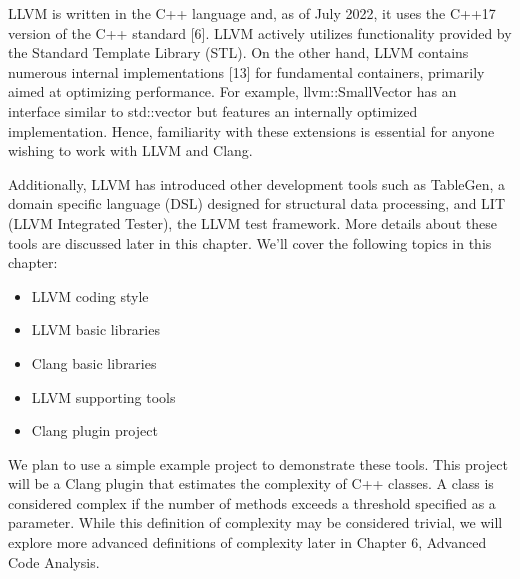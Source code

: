 LLVM is written in the C++ language and, as of July 2022, it uses the C++17 version of the C++ standard [6]. LLVM actively utilizes functionality provided by the Standard Template Library (STL). On the other hand, LLVM contains numerous internal implementations [13] for fundamental containers, primarily aimed at optimizing performance. For example, llvm::SmallVector has an interface similar to std::vector but features an internally optimized implementation. Hence, familiarity with these extensions is essential for anyone wishing to work with LLVM and Clang.

Additionally, LLVM has introduced other development tools such as TableGen, a domain specific language (DSL) designed for structural data processing, and LIT (LLVM Integrated Tester), the LLVM test framework. More details about these tools are discussed later in this chapter. We'll cover the following topics in this chapter:

\begin{itemize}
\item
LLVM coding style

\item
LLVM basic libraries

\item
Clang basic libraries

\item
LLVM supporting tools

\item
Clang plugin project
\end{itemize}

We plan to use a simple example project to demonstrate these tools. This project will be a Clang plugin that estimates the complexity of C++ classes. A class is considered complex if the number of methods exceeds a threshold specified as a parameter. While this definition of complexity may be considered trivial, we will explore more advanced definitions of complexity later in Chapter 6, Advanced Code Analysis.
